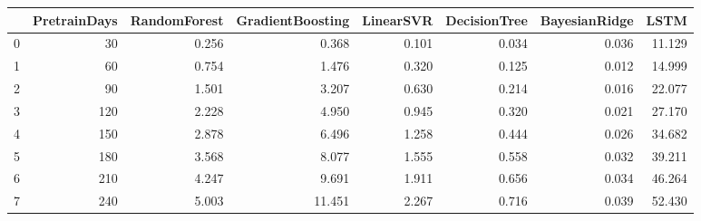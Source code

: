 \begin{tabular}{lrrrrrrr}
\toprule
{} &  PretrainDays &  RandomForest &  GradientBoosting &  LinearSVR &  DecisionTree &  BayesianRidge &   LSTM \\
\midrule
0 &            30 &         0.256 &             0.368 &      0.101 &         0.034 &          0.036 & 11.129 \\
1 &            60 &         0.754 &             1.476 &      0.320 &         0.125 &          0.012 & 14.999 \\
2 &            90 &         1.501 &             3.207 &      0.630 &         0.214 &          0.016 & 22.077 \\
3 &           120 &         2.228 &             4.950 &      0.945 &         0.320 &          0.021 & 27.170 \\
4 &           150 &         2.878 &             6.496 &      1.258 &         0.444 &          0.026 & 34.682 \\
5 &           180 &         3.568 &             8.077 &      1.555 &         0.558 &          0.032 & 39.211 \\
6 &           210 &         4.247 &             9.691 &      1.911 &         0.656 &          0.034 & 46.264 \\
7 &           240 &         5.003 &            11.451 &      2.267 &         0.716 &          0.039 & 52.430 \\
\bottomrule
\end{tabular}
